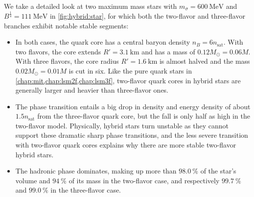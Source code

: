 We take a detailed look at two maximum mass stars
with $m_\sigma=\SI{600}{\mega\electronvolt}$ and $B^\frac14 = \SI{111}{\mega\electronvolt}$ in \cref{fig:hybrid:star},
for which both the two-flavor and three-flavor branches exhibit notable stable segments:
\begin{itemize}
\item In both cases, the quark core has a central baryon density $n_B = 6 n_\text{sat}$.
      With two flavors, the core extends $R' = \SI{3.1}{\kilo\meter}$ and has a mass of $0.12 M_\odot = 0.06 M$.
      With three flavors, the core radius $R' = \SI{1.6}{\kilo\meter}$ is almost halved and the mass $0.02 M_\odot = 0.01 M$ is cut in six.
      Like the pure quark stars in \cref{chap:mit,chap:lsm2f,chap:lsm3f},
      two-flavor quark cores in hybrid stars are generally larger and heavier than three-flavor ones.
\item The phase transition entails a big drop in density and energy density of about $1.5 n_\text{sat}$ from the three-flavor quark core,
      but the fall is only half as high in the two-flavor model.
      Physically, hybrid stars turn unstable as they cannot support these dramatic sharp phase transitions,
      and the less severe transition with two-flavor quark cores explains why there are more stable two-flavor hybrid stars.
\item The hadronic phase dominates, 
      making up more than $\SI{98.0}{\percent}$ of the star's volume and $\SI{94}{\percent}$ of its mass in the two-flavor case,
      and respectively $\SI{99.7}{\percent}$ and $\SI{99.0}{\percent}$ in the three-flavor case.
\end{itemize}

